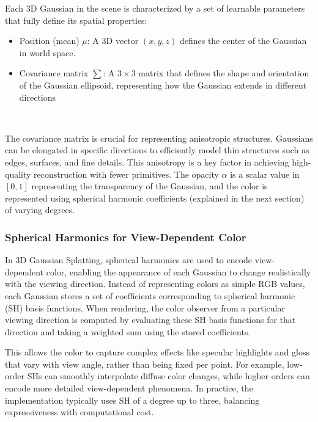 \documentclass[conference]{IEEEtran}
\begin{document}
Each 3D Gaussian in the scene is characterized by a set of learnable parameters that fully define its spatial properties:

\begin{itemize}
    \item Position (mean) $\mu$: A 3D vector $(x, y, z)$ defines the center of the Gaussian in world space.
    \item Covariance matrix $\sum$: A $3 \times 3$ matrix that defines the shape and orientation of the Gaussian ellipsoid, representing how the Gaussian extends in different directions
\end{itemize} ~\cite{3d_gaussian_splatting_paper_p4}

The covariance matrix is crucial for representing anisotropic structures. Gaussians can be elongated in specific directions to efficiently model thin structures such as edges, surfaces, and fine details. This anisotropy is a key factor in achieving high-quality reconstruction with fewer primitives. The opacity $\alpha$ is a scalar value in $[0,1]$ representing the transparency of the Gaussian, and the color is represented using spherical harmonic coefficients (explained in the next section) of varying degrees.~\cite{3d_gaussian_splatting_paper_p4}

\subsubsection{Spherical Harmonics for View-Dependent Color}

In 3D Gaussian Splatting, spherical harmonics are used to encode view-dependent color, enabling the appearance of each Gaussian to change realistically with the viewing direction. Instead of representing colors as simple RGB values, each Gaussian stores a set of coefficients corresponding to spherical harmonic (SH) basis functions. When rendering, the color observer from a particular viewing direction is computed by evaluating these SH basis functions for that direction and taking a weighted sum using the stored coefficients.~\cite{3d_gaussian_splatting_paper_p3}~\cite{towards_data_science_gaussian_splatting}

This allows the color to capture complex effects like specular highlights and gloss that vary with view angle, rather than being fixed per point. For example, low-order SHs can smoothly interpolate diffuse color changes, while higher orders can encode more detailed view-dependent phenomena. In practice, the implementation typically uses SH of a degree up to three, balancing expressiveness with computational cost.~\cite{3d_gaussian_splatting_paper_p3}~\cite{3d_gaussian_splatting_paper_p4}
\end{document}

